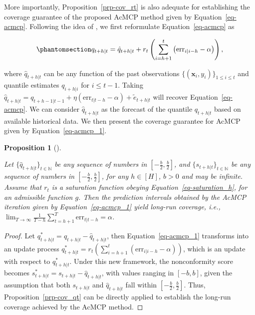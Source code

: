 \documentclass[
  11pt,
  a4paper,
]{article}
\theoremstyle{plain}
\theoremstyle{plain}
\newtheorem{proposition}{Proposition}[section]
\theoremstyle{remark}
\begin{document}
More importantly, Proposition~\ref{prp-cov_rt} is also adequate for
establishing the coverage guarantee of the proposed AcMCP method given
by Equation~\ref{eq-acmcp}. Following the idea of
\textcite{angelopoulos2024}, we first reformulate
Equation~\ref{eq-acmcp} as

\begin{equation}\phantomsection\label{eq-acmcp_1}{
q_{t+h|t}=\hat{q}_{t+h|t}+r_t\left(\sum_{i=h+1}^t \left(\mathrm{err}_{i|i-h}-\alpha\right)\right),
}\end{equation}

where \(\hat{q}_{t+h|t}\) can be any function of the past observations
\(\{(\bm{x}_i, y_i)\}_{1 \leq i \leq t}\) and quantile estimates
\(q_{i+h|i}\) for \(i \leq t-1\). Taking
\(\hat{q}_{t+h|t}=q_{t+h-1|t-1}+\eta \left(\mathrm{err}_{t|t-h}-\alpha\right)+\tilde{e}_{t+h|t}\)
will recover Equation~\ref{eq-acmcp}. We can consider
\(\hat{q}_{t+h|t}\) as the forecast of the quantile \(q_{t+h|t}\) based
on available historical data. We then present the coverage guarantee for
AcMCP given by Equation~\ref{eq-acmcp_1}.

\begin{proposition}[]\protect\hypertarget{prp-cov_acmcp}{}\label{prp-cov_acmcp}

Let \(\{\hat{q}_{t+h|t}\}_{t\in\mathbb{N}}\) be any sequence of numbers
in \([-\frac{b}{2}, \frac{b}{2}]\), and
\(\{s_{t+h|t}\}_{t\in\mathbb{N}}\) be any sequence of numbers in
\([-\frac{b}{2},\frac{b}{2}]\), for any \(h\in[H]\), \(b>0\) and may be
infinite. Assume that \(r_t\) is a saturation function obeying
Equation~\ref{eq-saturation_h}, for an admissible function \(g\). Then
the prediction intervals obtained by the AcMCP iteration given by
Equation~\ref{eq-acmcp_1} yield long-run coverage, i.e.,
\(\lim _{T \rightarrow \infty} \frac{1}{T-h} \sum_{t=h+1}^T \mathrm{err}_{t|t-h} = \alpha\).

\end{proposition}

\begin{proof}
Let \(q_{t+h|t}^{*}=q_{t+h|t}-\hat{q}_{t+h|t}\), then
Equation~\ref{eq-acmcp_1} transforms into an update process
\(q_{t+h|t}^{*}=r_t\left(\sum_{i=h+1}^t \left(\mathrm{err}_{i|i-h}-\alpha\right)\right)\),
which is an update with respect to \(q_{t+h|t}^{*}\). Under this new
framework, the nonconformity score becomes
\(s_{t+h|t}^{*}=s_{t+h|t}-\hat{q}_{t+h|t}\), with values ranging in
\([-b,b]\), given the assumption that both \(s_{t+h|t}\) and
\(\hat{q}_{t+h|t}\) fall within \([-\frac{b}{2},\frac{b}{2}]\). Thus,
Proposition~\ref{prp-cov_qt} can be directly applied to establish the
long-run coverage achieved by the AcMCP method.
\end{proof}
\end{document}
